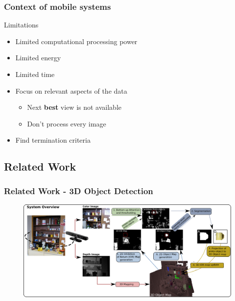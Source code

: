 \documentclass[t]{beamer} %
\begin{document}
\begin{frame}
	\frametitle{ Context of mobile systems }
	\begin{block}{Limitations}    
		\begin{itemize}
			\item Limited computational processing power
			\item Limited energy
			\item Limited time
		\end{itemize}
	\end{block}
	\begin{itemize}
		\item Focus on relevant aspects of the data
		\begin{itemize}
			\item Next \textbf{best} view is not available
			\item Don't process every image
		\end{itemize}		
		\item Find termination criteria
	\end{itemize}
\end{frame}

\subsection{Related Work}
\begin{frame}
	\frametitle{ Related Work - 3D Object Detection }
	\begin{figure}[h]
		\includegraphics[width=1\textwidth]{src/frintrop.png}
	\end{figure}
	\centering
	\scriptsize \cite{garcia2013computational}
\end{frame}
\end{document}

